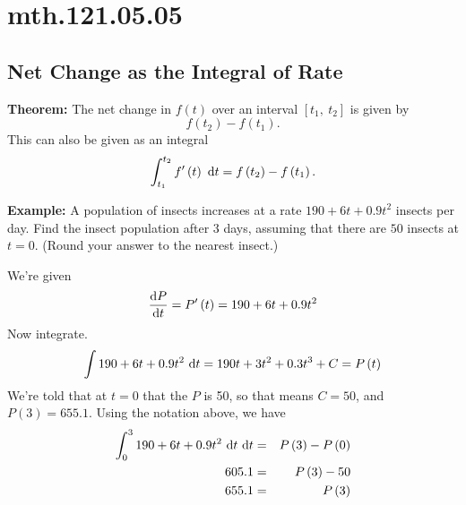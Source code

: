 \documentclass[12pt,addpoints, answers, fleqn]{exam}
\begin{document}
\section{mth.121.05.05}
\subsection{Net Change as the Integral of Rate}
\textbf{Theorem:} The net change in $f\left( t \right)$ over an interval $\left[ t_1, \ t_2 \right]$ is given by
\[
f\left( t_2 \right) - f\left( t_1 \right).
\]
This can also be given as an integral
\[
\int_{t_1}^{t_2} f'\left( t \right) \ {\rm{d}} t = f\left( t_2 \right) - f\left( t_1 \right).
\]

\textbf{Example:}  A population of insects increases at a rate $190 + 6t + 0.9t^2$ insects per day. Find the insect population after $3$ days, assuming that there are $50$ insects at $t = 0$. (Round your answer to the nearest insect.)



\begin{solution}
We're given
\[
\frac{{\rm{d}}P}{{\rm{d}}t} = P'\left( t \right) = 190 + 6t + 0.9t^2
\]
Now integrate.
\[
\int 190 + 6t + 0.9t^2 \ {\rm{d}} t = 190t + 3t^2 +0.3t^3 + C = P\left( t \right)
\]
We're told that at $t=0$ that the $P$ is 50, so that means $C=50$, and $P\left( 3 \right) = 655.1$. Using the notation above, we have
\begin{eqnarray*}
\int_{0}^{3} 190 + 6t + 0.9t^2 \ {\rm{d}} t \ {\rm{d}} t &=& P\left( 3 \right) - P\left( 0 \right)\\
605.1 &=& P\left( 3 \right) - 50\\
655.1 &=& P\left( 3 \right)
\end{eqnarray*}

\end{solution}
\end{document}
